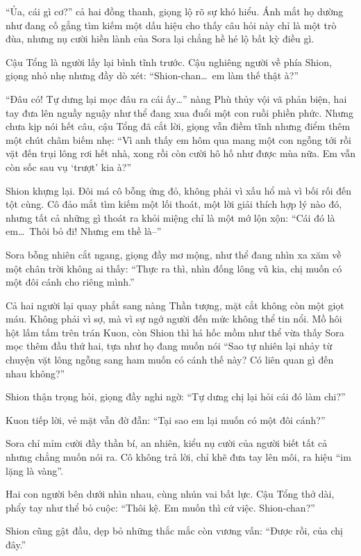\documentclass[../main.tex]{subfiles}
\begin{document}
``Ủa, cái gì cơ?'' cả hai đồng thanh, giọng lộ rõ sự khó hiểu. Ánh mắt họ dường như đang cố gắng tìm kiếm một dấu hiệu cho thấy câu hỏi này chỉ là một trò đùa, nhưng nụ cười hiền lành của Sora lại chẳng hề hé lộ bất kỳ điều gì.

Cậu Tổng là người lấy lại bình tĩnh trước. Cậu nghiêng người về phía Shion, giọng nhỏ nhẹ nhưng đầy dò xét: ``Shion-chan\dots\ em làm thế thật à?''

``Đâu có! Tự dưng lại mọc đâu ra cái ấy\dots'' nàng Phù thủy vội vã phản biện, hai tay đưa lên nguầy nguậy như thể đang xua đuổi một con ruồi phiền phức. Nhưng chưa kịp nói hết câu, cậu Tổng đã cắt lời, giọng vẫn điềm tĩnh nhưng điểm thêm một chút châm biếm nhẹ: ``Vì anh thấy em hôm qua mang một con ngỗng tới rồi vặt đến trụi lông rơi hết nhà, xong rồi còn cười hô hố như được mùa nữa. Em vẫn còn sốc sau vụ `trượt' kia à?''

Shion khựng lại. Đôi má cô bỗng ửng đỏ, không phải vì xấu hổ mà vì bối rối đến tột cùng. Cô đảo mắt tìm kiếm một lối thoát, một lời giải thích hợp lý nào đó, nhưng tất cả những gì thoát ra khỏi miệng chỉ là một mớ lộn xộn: ``Cái đó là em\dots\ Thôi bỏ đi! Nhưng em thề là--''

Sora bỗng nhiên cắt ngang, giọng đầy mơ mộng, như thể đang nhìn xa xăm về một chân trời không ai thấy: ``Thực ra thì, nhìn đống lông vũ kia, chị muốn có một đôi cánh cho riêng mình.''

Cả hai người lại quay phắt sang nàng Thần tượng, mặt cắt không còn một giọt máu. Không phải vì sợ, mà vì sự ngớ người đến mức không thể tin nổi. Mồ hôi hột lấm tấm trên trán Kuon, còn Shion thì há hốc mồm như thể vừa thấy Sora mọc thêm đầu thứ hai, tựa như họ đang muốn nói ``Sao tự nhiên lại nhảy từ chuyện vặt lông ngỗng sang ham muốn có cánh thế này? Có liên quan gì đến nhau không?''

Shion thận trọng hỏi, giọng đầy nghi ngờ: ``Tự dưng chị lại hỏi cái đó làm chi?''

Kuon tiếp lời, vẻ mặt vẫn đờ đẫn: ``Tại sao em lại muốn có một đôi cánh?''

Sora chỉ mỉm cười đầy thần bí, an nhiên, kiểu nụ cười của người biết tất cả nhưng chẳng muốn nói ra. Cô không trả lời, chỉ khẽ đưa tay lên môi, ra hiệu ``im lặng là vàng''.

Hai con người bên dưới nhìn nhau, cùng nhún vai bất lực. Cậu Tổng thở dài, phẩy tay như thể bỏ cuộc: ``Thôi kệ. Em muốn thì cứ việc. Shion-chan?''

Shion cũng gật đầu, dẹp bỏ những thắc mắc còn vương vấn: ``Được rồi, của chị đây.''
\end{document}
